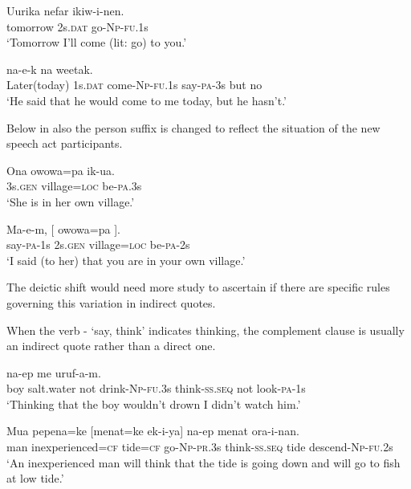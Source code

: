 \ea%
\label{ex:8:x1264}
\gll Uurika  nefar  ikiw-i-nen. \\
tomorrow  2s.\textsc{dat} go-\textsc{Np}-\textsc{fu}.1s\\
\glt`Tomorrow I'll come (lit: go) to you.'
\z


\ea%
\label{ex:8:x1265}
  na-e-k  na  weetak.\\
Later(today)  1s.\textsc{dat} come-\textsc{Np}-\textsc{fu}.1s  say-\textsc{pa}-3s but no\\
\glt`He said that he would come to me today, but he hasn't.'
\z


Below in  also the person suffix is changed to reflect the situation of the new speech act participants. 

\ea%
\label{ex:8:x1267}
\gll Ona  owowa=pa  ik-ua.\\
3s.\textsc{gen} village=\textsc{loc} be-\textsc{pa}.3s\\
\glt`She is in her own village.'
\z


\ea%
\label{ex:8:x1266}
\gll Ma-e-m,  [ \textstyleEmphasizedVernacularWords{} owowa=pa  ]. \\
say-\textsc{pa}-1s 2s.\textsc{gen} village=\textsc{loc} be-\textsc{pa}-2s\\
\glt`I said (to her) that you are in your own village.'
\z


The deictic shift would need more study to ascertain if there are specific rules governing this variation in indirect quotes.

When the verb - `say, think' indicates thinking, the complement clause is usually an indirect quote rather than a direct one. 

\ea%
\label{ex:8:x1588}
 na-ep  me  uruf-a-m.\\
boy  salt.water  not  drink-\textsc{Np}-\textsc{fu}.3s think-\textsc{ss}.\textsc{seq} not look-\textsc{pa}-1s\\
\glt`Thinking that the boy wouldn't drown I didn't watch him.'
\z


\ea%
\label{ex:8:x1589}
\gll Mua  pepena=ke  [menat=ke  ek-i-ya]  na-ep menat  ora-i-nan.\\
man  inexperienced=\textsc{cf} tide=\textsc{cf} go-\textsc{Np}-\textsc{pr}.3s think-\textsc{ss}.\textsc{seq} tide descend-\textsc{Np}-\textsc{fu}.2s\\
\glt`An inexperienced man will think that the tide is going down and will go to fish at low tide.'
\z


